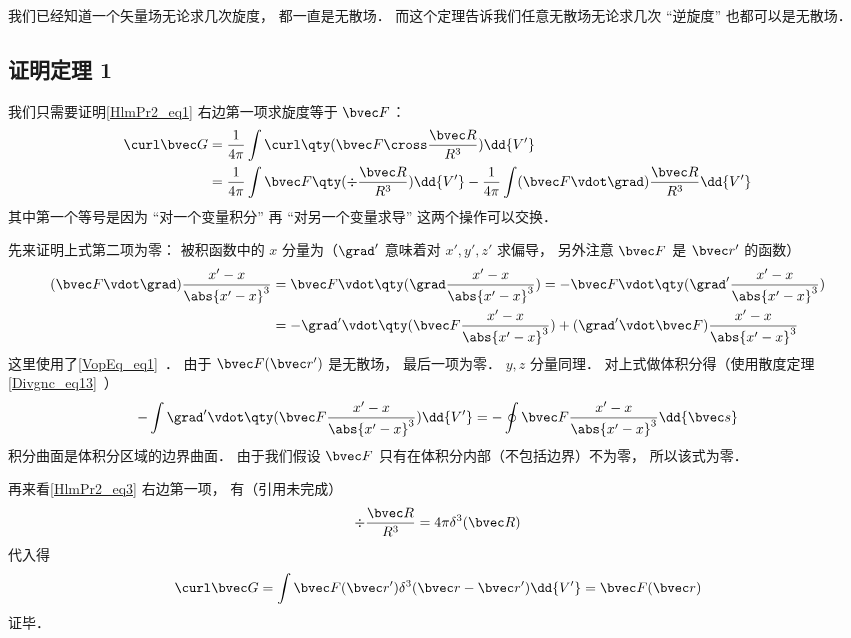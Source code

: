 我们已经知道一个矢量场无论求几次旋度， 都一直是无散场． 而这个定理告诉我们任意无散场无论求几次 “逆旋度” 也都可以是无散场．

\subsection{证明定理 1}
我们只需要证明\autoref{HlmPr2_eq1} 右边第一项求旋度等于 $\bvec F$：
\begin{equation}\label{HlmPr2_eq3}
\begin{aligned}
\curl \bvec G &= \frac{1}{4\pi}\int \curl \qty(\bvec F \cross \frac{\bvec R}{R^3}) \dd{V'}\\
&= \frac{1}{4\pi}\int\bvec F \qty(\div \frac{\bvec R}{R^3}) \dd{V'} -  \frac{1}{4\pi}\int(\bvec F \vdot \grad) \frac{\bvec R}{R^3} \dd{V'}
\end{aligned}
\end{equation}
其中第一个等号是因为 “对一个变量积分” 再 “对另一个变量求导” 这两个操作可以交换． %

先来证明上式第二项为零： 被积函数中的 $x$ 分量为（$\grad'$ 意味着对 $x', y', z'$ 求偏导， 另外注意 $\bvec F$ 是 $\bvec r'$ 的函数）
\begin{equation}\label{HlmPr2_eq2}
\begin{aligned}
(\bvec F \vdot \grad) \frac{x' - x}{\abs{x'-x}^3} &= \bvec F \vdot \qty(\grad \frac{x' - x}{\abs{x'-x}^3}) = -\bvec F \vdot \qty(\grad' \frac{x' - x}{\abs{x'-x}^3})\\
&= - \grad' \vdot \qty(\bvec F \frac{x' - x}{\abs{x'-x}^3}) + (\grad' \vdot \bvec F) \frac{x' - x}{\abs{x'-x}^3}
\end{aligned}
\end{equation}
这里使用了\autoref{VopEq_eq1}~． 由于 $\bvec F(\bvec r')$ 是无散场， 最后一项为零． $y, z$ 分量同理． 对上式做体积分得（使用散度定理\autoref{Divgnc_eq13}~）
\begin{equation}
- \int \grad' \vdot \qty(\bvec F \frac{x' - x}{\abs{x'-x}^3})\dd{V'} = -\oint \bvec F \frac{x' - x}{\abs{x'-x}^3} \dd{\bvec s}
\end{equation}
积分曲面是体积分区域的边界曲面． 由于我们假设 $\bvec F$ 只有在体积分内部（不包括边界）不为零， 所以该式为零．

再来看\autoref{HlmPr2_eq3} 右边第一项， 有（引用未完成）
\begin{equation}
\div \frac{\bvec R}{R^3} = 4\pi \delta^3(\bvec R)
\end{equation}
代入得
\begin{equation}
\curl \bvec G = \int \bvec F(\bvec r') \delta^3(\bvec r - \bvec r') \dd{V'} = \bvec F(\bvec r)
\end{equation}
证毕．

